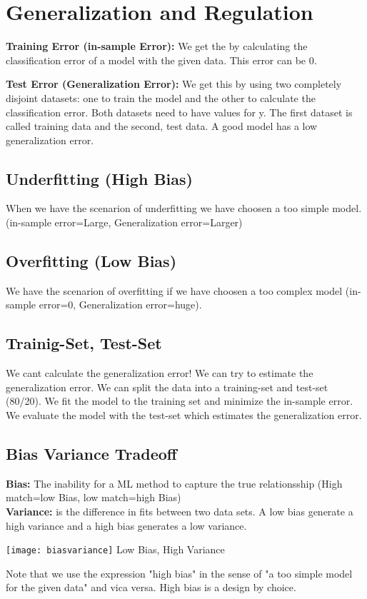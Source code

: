\section{Generalization and Regulation}
\textbf{Training Error (in-sample Error):}  We get the by calculating the classification error of a model with the given data. This error can be 0.

\textbf{Test Error (Generalization Error):} We get this by using two completely disjoint datasets: one to train the model and the other to calculate the classification error. Both datasets need to have values for y. The first dataset is called training data and the second, test data. A good model has a low generalization error.

\subsection{Underfitting (High Bias)}
When we have the scenarion of underfitting we have choosen a too simple model. (in-sample error=Large, Generalization error=Larger)

\subsection{Overfitting (Low Bias)}
We have the scenarion of overfitting if we have choosen a too complex model (in-sample error=0, Generalization error=huge).

\subsection{Trainig-Set, Test-Set}
We cant calculate the generalization error! We can try to estimate the generalization error. We can split the data into a training-set and test-set (80/20). We fit the model to the training set and minimize the in-sample error. We evaluate the model with the test-set which estimates the generalization error.

\subsection{Bias Variance Tradeoff}
\begin{minipage}{0,5\linewidth}
	\textbf{Bias:} The inability for a ML method to capture the true relationsship (High match=low Bias, low match=high Bias)\\
	\textbf{Variance:} is the difference in fits between two data sets.
	A low bias generate a high variance and a high bias generates a low variance.  
\end{minipage}
\begin{minipage}{0,5\linewidth}
	\texttt{[image: biasvariance]}
	Low Bias, High Variance
\end{minipage}
Note that we use the expression "high bias" in the sense of "a too simple model for the given data" and vica versa. High bias is a design by choice.

